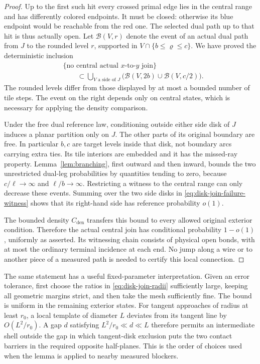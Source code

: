 \begin{proof}
Up to the first such hit every crossed primal edge lies in the central
range and has differently colored endpoints.  It must be closed:
otherwise its blue endpoint would be reachable from the red one.
The selected dual path up to that hit is thus actually open.  Let
$\mathcal B(V,r)$ denote the event of an actual dual path from $J$ to
the rounded level $r$, supported in
$V\cap\{b\le\varrho\le c\}$.  We have proved the deterministic inclusion
\begin{equation}\label{eq:disk-join-failure-witness}
 \begin{aligned}
 &\{\text{no central actual }x\text{-to-}y\text{ join}\}\\
 &\qquad\subset
 \bigcup_{V\text{ a side of }J}
       \bigl(\mathcal B(V,2b)\cup\mathcal B(V,c/2)\bigr).
 \end{aligned}
\end{equation}
The rounded levels differ from those displayed by at most a bounded
number of tile steps.  The event on the right depends only on central
states, which is necessary for applying the density comparison.

Under the free dual reference law, conditioning outside either side
disk of $J$ induces a planar partition only on $J$.  The other parts
of its original boundary are free.  In particular $b,c$ are target
levels inside that disk, not boundary arcs carrying extra ties.
Its tile interiors are embedded and it has the missed-ray property.
Lemma~\ref{lem:branching}, first outward and then inward, bounds the
two unrestricted dual-leg probabilities by quantities tending to zero,
because $c/\ell\to\infty$ and $\ell/b\to\infty$.  Restricting a witness
to the central range can only decrease these events.  Summing over the
two side disks in \eqref{eq:disk-join-failure-witness} shows that its
right-hand side has reference probability $o(1)$.

The bounded density $C_{\mathrm{den}}$ transfers this bound to every
allowed original exterior condition.  Therefore the actual central
join has conditional probability $1-o(1)$, uniformly as asserted.
Its witnessing chain consists of physical open bonds, with at most
the ordinary terminal incidence at each end.  No jump along a wire or
to another piece of a measured path is needed to certify this local
connection.
\end{proof}

The same statement has a useful fixed-parameter interpretation.  Given
an error tolerance, first choose the ratios in
\eqref{eq:disk-join-radii} sufficiently large, keeping all geometric
margins strict, and then take the mesh sufficiently fine.  The bound is
uniform in the remaining exterior states.  For tangent approaches of
radius at least $r_0$, a local template of diameter $L$ deviates from
its tangent line by $O(L^2/r_0)$.  A gap $d$ satisfying
$L^2/r_0\ll d\ll L$ therefore permits an intermediate shell outside the
gap in which tangent-disk exclusion puts the two contact barriers in
the required opposite half-planes.  This is the order of choices used
when the lemma is applied to nearby measured blockers.

